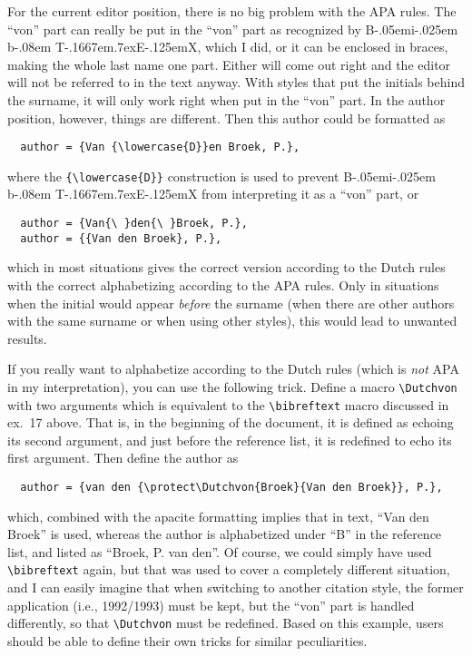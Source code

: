 \documentclass{article}
\newcommand{\bibreftext}[2]{#2}
\newcommand{\Dutchvon}[2]{#2}
\def\BibTeX{{\rm B\kern-.05em{\sc i\kern-.025em b}\kern-.08em
    T\kern-.1667em\lower.7ex\hbox{E}\kern-.125emX}}%
\newcommand{\pkg}[1]{\textsf{#1}}%
\begin{document}
\begin{enumerate}
      For the current editor position, there is no big problem with
      the APA rules. The ``von'' part can really be put in the ``von''
      part as recognized by \BibTeX{}, which I did, or it can be enclosed
      in braces, making the whole last name one part. Either will come
      out right and the editor will not be referred to in the text
      anyway. With styles that put the initials behind the surname,
      it will only work right when put in the ``von'' part. In the
      author position, however, things are different. Then this author
      could be formatted as
\begin{verbatim}
  author = {Van {\lowercase{D}}en Broek, P.},
\end{verbatim}
      where the \verb+{\lowercase{D}}+ construction is used to prevent
      \BibTeX{} from interpreting it as a ``von'' part, or
\begin{verbatim}
  author = {Van{\ }den{\ }Broek, P.},
  author = {{Van den Broek}, P.},
\end{verbatim}
      which in most situations gives the correct version according to the
      Dutch rules with the correct alphabetizing according to the APA
      rules. Only in situations when the initial would appear
      \emph{before} the surname (when there are other authors with the
      same surname or when using other styles), this would lead to
      unwanted results.

      If you really want to alphabetize according to the Dutch rules
      (which is \emph{not} APA in my interpretation), you can use the
      following trick. Define a macro \verb+\Dutchvon+ with
      two arguments which is equivalent to the \verb+\bibreftext+
      macro discussed in ex.~17 above. That is, in the beginning
      of the document, it is defined as echoing its second argument,
      and just before the reference list, it is redefined to echo
      its first argument. Then define the author as
\begin{verbatim}
  author = {van den {\protect\Dutchvon{Broek}{Van den Broek}}, P.},
\end{verbatim}
      which, combined with the \pkg{apacite} formatting implies
      that in text, ``Van den Broek'' is used, whereas the author
      is alphabetized under ``B'' in the reference list, and listed
      as ``Broek, P. van den''. Of course, we could simply have
      used \verb+\bibreftext+ again, but that was used to cover a
      completely different situation, and I can easily imagine that
      when switching to another citation style, the former application
      (i.e., 1992/1993) must be kept, but the ``von'' part is handled
      differently, so that \verb+\Dutchvon+ must be redefined.
      Based on this example, users should be able to define their
      own tricks for similar peculiarities.


\end{enumerate}
\end{document}

